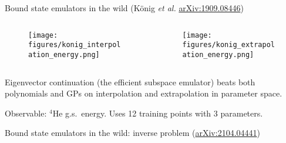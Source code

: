 \documentclass[xcolor=dvipsnames, aspectratio=169]{beamer}
\begin{document}
\begin{frame}{Bound state emulators in the wild (\alert{K\"onig \emph{et al.} \href{https://arxiv.org/abs/1909.08446}{arXiv:1909.08446}})}
\begin{columns}
\begin{column}{0.5\textwidth}
\begin{figure}
\texttt{[image: figures/konig\_interpolation\_energy.png]}
\end{figure}
\end{column}
\begin{column}{0.5\textwidth}
\begin{figure}
\texttt{[image: figures/konig\_extrapolation\_energy.png]}
\end{figure}
\end{column}
\end{columns}
Eigenvector continuation (the efficient subspace emulator) beats both polynomials and GPs on interpolation and extrapolation in parameter space.

Observable: $^{4}$He g.s.\ energy. Uses 12 training points with 3 parameters.
\end{frame}


\begin{frame}{Bound state emulators in the wild: inverse problem (\alert{\href{https://arxiv.org/abs/2104.04441}{arXiv:2104.04441}})}
\begin{columns}[t]
\begin{column}{0.5\textwidth}
\begin{figure}
\end{figure}
\end{column}
\begin{column}{0.5\textwidth}
\begin{figure}
\end{figure}
\end{column}
\end{columns}
\end{frame}
\end{document}
